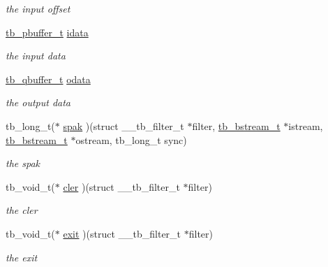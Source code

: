 \begin{DoxyCompactItemize}
\begin{DoxyCompactList}\small\item\em the input offset \end{DoxyCompactList}\item 
\hypertarget{structtb__filter__t_adfc380dc61c02149b788de469c90bc11}{\hyperlink{structtb__pbuffer__t}{tb\-\_\-pbuffer\-\_\-t} \hyperlink{structtb__filter__t_adfc380dc61c02149b788de469c90bc11}{idata}}\label{structtb__filter__t_adfc380dc61c02149b788de469c90bc11}

\begin{DoxyCompactList}\small\item\em the input data \end{DoxyCompactList}\item 
\hypertarget{structtb__filter__t_a4559f43d5268a063f44fabb22b72e75c}{\hyperlink{structtb__qbuffer__t}{tb\-\_\-qbuffer\-\_\-t} \hyperlink{structtb__filter__t_a4559f43d5268a063f44fabb22b72e75c}{odata}}\label{structtb__filter__t_a4559f43d5268a063f44fabb22b72e75c}

\begin{DoxyCompactList}\small\item\em the output data \end{DoxyCompactList}\item 
\hypertarget{structtb__filter__t_a4725d9410c1279c6d40df3092a256eda}{tb\-\_\-long\-\_\-t($\ast$ \hyperlink{structtb__filter__t_a4725d9410c1279c6d40df3092a256eda}{spak} )(struct \-\_\-\-\_\-tb\-\_\-filter\-\_\-t $\ast$filter, \hyperlink{structtb__bstream__t}{tb\-\_\-bstream\-\_\-t} $\ast$istream, \hyperlink{structtb__bstream__t}{tb\-\_\-bstream\-\_\-t} $\ast$ostream, tb\-\_\-long\-\_\-t sync)}\label{structtb__filter__t_a4725d9410c1279c6d40df3092a256eda}

\begin{DoxyCompactList}\small\item\em the spak \end{DoxyCompactList}\item 
\hypertarget{structtb__filter__t_a9e58a2a4baa0396f7a0c24cbb09f5796}{tb\-\_\-void\-\_\-t($\ast$ \hyperlink{structtb__filter__t_a9e58a2a4baa0396f7a0c24cbb09f5796}{cler} )(struct \-\_\-\-\_\-tb\-\_\-filter\-\_\-t $\ast$filter)}\label{structtb__filter__t_a9e58a2a4baa0396f7a0c24cbb09f5796}

\begin{DoxyCompactList}\small\item\em the cler \end{DoxyCompactList}\item 
\hypertarget{structtb__filter__t_a5bfe82984e8615c773473db51b1e50bc}{tb\-\_\-void\-\_\-t($\ast$ \hyperlink{structtb__filter__t_a5bfe82984e8615c773473db51b1e50bc}{exit} )(struct \-\_\-\-\_\-tb\-\_\-filter\-\_\-t $\ast$filter)}\label{structtb__filter__t_a5bfe82984e8615c773473db51b1e50bc}

\begin{DoxyCompactList}\small\item\em the exit \end{DoxyCompactList}\end{DoxyCompactItemize}


